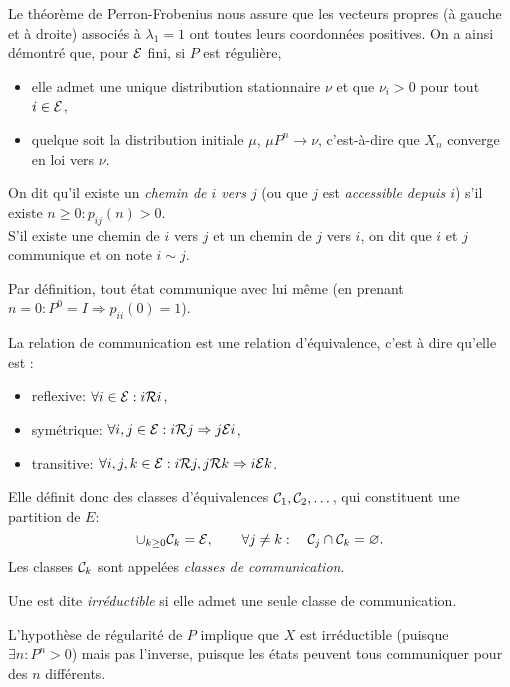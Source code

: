 \remark
Le théorème de Perron-Frobenius nous assure que les vecteurs propres (à gauche et à droite) associés à $\lambda_1 = 1$ ont toutes leurs coordonnées positives. On a ainsi démontré que, pour $\mathcal{E}$ fini, si $P$ est régulière, 
\begin{itemize}
  \item elle admet une unique distribution stationnaire $\nu$ et que $\nu_i > 0$ pour tout $i \in \mathcal{E}$, 
  \item quelque soit la distribution initiale $\mu$, $\mu P^n \rightarrow \nu$, c'est-à-dire que $X_n$ converge en loi vers $\nu$.
\end{itemize}

\begin{definition}
  On dit qu'il existe un {\em chemin de $i$ vers $j$} (ou que $j$ est {\em accessible depuis $i$}) s'il existe $n \geq 0: p_{ij}(n) > 0$. \\
  S'il existe une chemin de $i$ vers $j$ et un chemin de $j$ vers $i$, on dit que $i$ et $j$ communique et on note $i \sim j$.
\end{definition}

\remark
Par définition, tout état communique avec lui même (en prenant $n= 0 : P^0 = I \Rightarrow p_{ii}(0) = 1$).

La relation de communication est une relation d'équivalence, c'est à dire qu'elle est :
\begin{itemize}
  \item reflexive: $\forall i \in \mathcal{E}: i \mathcal{R} i$,
  \item symétrique: $\forall i, j \in \mathcal{E}: i \mathcal{R} j \Rightarrow j \mathcal{E} i$,
  \item transitive: $\forall i, j, k \in \mathcal{E}: i \mathcal{R} j, j \mathcal{R} k \Rightarrow i \mathcal{E} k$.
\end{itemize}
Elle définit donc des classes d'équivalences $\mathcal{C}_1, \mathcal{C}_2, \dots $, qui constituent une partition de $E$:
$$
\cup_{k \geq 0} \mathcal{C}_k = \mathcal{E}, \qquad \forall j \neq k: \quad \mathcal{C}_j \cap \mathcal{C}_k = \varnothing.
$$
Les classes $\mathcal{C}_k$ sont appelées {\em classes de communication}.

\begin{definition}
  Une \cM est dite {\em irréductible} si elle admet une seule classe de communication.
\end{definition}

\remark
L'hypothèse de régularité de $P$ implique que $X$ est irréductible (puisque $\exists n: P^n > 0$) mais pas l'inverse, puisque les états peuvent tous communiquer pour des $n$ différents.


